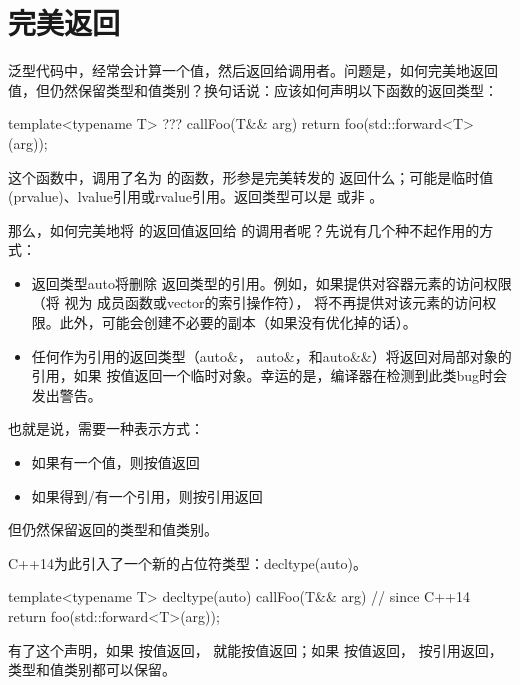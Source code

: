 \section{完美返回}
泛型代码中，经常会计算一个值，然后返回给调用者。问题是，如何完美地返回值，但仍然保留类型和值类别？换句话说：应该如何声明以下函数的返回类型：

\begin{cppcode}
template<typename T>
??? callFoo(T&& arg)
{
	return foo(std::forward<T>(arg));
}
\end{cppcode}

这个函数中，调用了名为  的函数，形参是完美转发的  返回什么；可能是临时值(prvalue)、lvalue引用或rvalue引用。返回类型可以是  或非 。

那么，如何完美地将  的返回值返回给  的调用者呢？先说有几个种不起作用的方式：

\begin{itemize}
	\item 返回类型auto将删除  返回类型的引用。例如，如果提供对容器元素的访问权限（将  视为  成员函数或vector的索引操作符）， 将不再提供对该元素的访问权限。此外，可能会创建不必要的副本（如果没有优化掉的话）。
	\item 任何作为引用的返回类型（auto\&，  auto\&，和auto\&\&）将返回对局部对象的引用，如果  按值返回一个临时对象。幸运的是，编译器在检测到此类bug时会发出警告。
\end{itemize}

也就是说，需要一种表示方式：

\begin{itemize}
	\item 如果有一个值，则按值返回
	\item 如果得到/有一个引用，则按引用返回
\end{itemize}

但仍然保留返回的类型和值类别。

C++14为此引入了一个新的占位符类型：decltype(auto)。

\begin{cppcode}
template<typename T>
decltype(auto) callFoo(T&& arg) // since C++14
{
	return foo(std::forward<T>(arg));
}
\end{cppcode}

有了这个声明，如果  按值返回， 就能按值返回；如果  按值返回， 按引用返回，类型和值类别都可以保留。











































